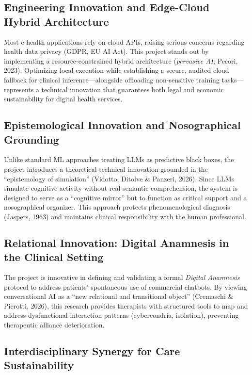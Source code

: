 \documentclass[11pt,a4paper]{article}
\begin{document}
\subsection{Engineering Innovation and Edge-Cloud Hybrid Architecture}

Most e-health applications rely on cloud APIs, raising serious concerns regarding health data privacy (GDPR, EU AI Act). This project stands out by implementing a resource-constrained hybrid architecture (\textit{pervasive AI}; Pecori, 2023). Optimizing local execution while establishing a secure, audited cloud fallback for clinical inference---alongside offloading non-sensitive training tasks---represents a technical innovation that guarantees both legal and economic sustainability for digital health services.

\subsection{Epistemological Innovation and Nosographical Grounding}

Unlike standard ML approaches treating LLMs as predictive black boxes, the project introduces a theoretical-technical innovation grounded in the ``epistemology of simulation'' (Vidotto, Ditolve \& Panzeri, 2026). Since LLMs simulate cognitive activity without real semantic comprehension, the system is designed to serve as a ``cognitive mirror'' but to function as critical support and a nosographical organizer. This approach protects phenomenological diagnosis (Jaspers, 1963) and maintains clinical responsibility with the human professional.

\subsection{Relational Innovation: Digital Anamnesis in the Clinical Setting}

The project is innovative in defining and validating a formal \textit{Digital Anamnesis} protocol to address patients' spontaneous use of commercial chatbots. By viewing conversational AI as a ``new relational and transitional object'' (Cremaschi \& Pierotti, 2026), this research provides therapists with structured tools to map and address dysfunctional interaction patterns (cybercondria, isolation), preventing therapeutic alliance deterioration.

\subsection{Interdisciplinary Synergy for Care Sustainability}
\end{document}
